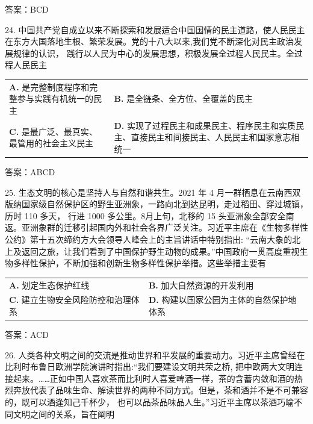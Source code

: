 \documentclass[UTF8,11pt]{ctexart}
\begin{document}
答案：BCD


24. 中国共产党自成立以来不断探索和发展适合中国国情的民主道路，使人民民主在东方大国落地生根、繁荣发展。党的十八大以来,我们党不断深化对民主政治发展规律的认识， 践行以人民为中心的发展思想，积极发展全过程人民民主。全过程人民民主


\begin{center}\begin{tabular}{>{\raggedright\arraybackslash}p{\dimexpr(\linewidth-4\tabcolsep)/2\relax}>{\raggedright\arraybackslash}p{\dimexpr(\linewidth-4\tabcolsep)/2\relax}}
\textbf{A.} 是完整制度程序和完整参与实践有机统一的民主 & \textbf{B.} 是全链条、全方位、全覆盖的民主\\[.35em]
\textbf{C.} 是最广泛、最真实、最管用的社会主义民主 & \textbf{D.} 实现了过程民主和成果民主、程序民主和实质民主、直接民主和间接民主、人民民主和国家意志相统一\\[.35em]\end{tabular}\end{center}

答案：ABCD


25. 生态文明的核心是坚持人与自然和谐共生。2021 年 4 月一群栖息在云南西双版纳国家级自然保护区的野生亚洲象，一路向北到达昆明，走过稻田、穿过城镇，历时 110 多天， 行进 1000 多公里。8月上旬，北移的 15 头亚洲象全部安全南返。亚洲象群的迁移引起国内外和社会各界广泛关注。习近平主席在《生物多样性公约》第十五次缔约方大会领导人峰会上的主旨讲话中特别指出: “云南大象的北上及返回之旅，让我们看到了中国保护野生动物的成果。”中国政府一贯高度重视生物多样性保护，不断加强和创新生物多样性保护举措。这些举措主要有


\begin{center}\begin{tabular}{>{\raggedright\arraybackslash}p{\dimexpr(\linewidth-4\tabcolsep)/2\relax}>{\raggedright\arraybackslash}p{\dimexpr(\linewidth-4\tabcolsep)/2\relax}}
\textbf{A.} 划定生态保护红线 & \textbf{B.} 加大自然资源的开发利用\\[.35em]
\textbf{C.} 建立生物安全风险防控和治理体系 & \textbf{D.} 构建以国家公园为主体的自然保护地体系\\[.35em]\end{tabular}\end{center}

答案：ACD


26. 人类各种文明之间的交流是推动世界和平发展的重要动力。习近平主席曾经在比利时布鲁日欧洲学院演讲时指出:“我们要建设文明共荣之桥, 把中欧两大文明连接起来。……正如中国人喜欢茶而比利时人喜爱啤酒一样，茶的含蓄内敛和酒的热烈奔放代表了品味生命、解读世界的两种不同方式。但是，茶和酒并不是不可兼容的，既可以酒逢知己千杯少， 也可以品茶品味品人生。”习近平主席以茶酒巧喻不同文明之间的关系，旨在阐明
\end{document}
